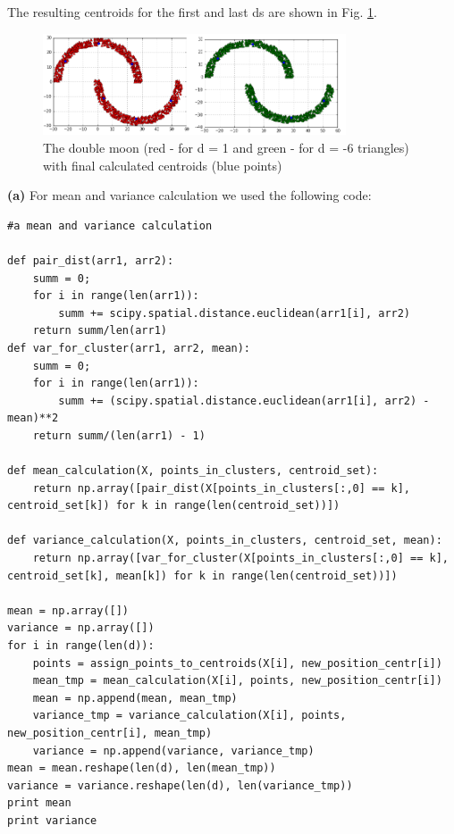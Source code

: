 \documentclass[a4paper, 12pt]{article}
\begin{document}
The resulting centroids for the first and last ds are shown in Fig. \ref{fig:centrFin}. \\

\begin{figure}[h]
  \centering
  \caption{The double moon (red - for d = 1 and green - for d = -6 triangles) with final calculated centroids (blue points) \label{fig:centrFin}}
  \includegraphics[width=0.8\textwidth]{centrFin}
\end{figure}

\textbf{(a)} For mean and variance calculation we used the following code:

\begin{lstlisting}
#a mean and variance calculation

def pair_dist(arr1, arr2):
    summ = 0;
    for i in range(len(arr1)):
        summ += scipy.spatial.distance.euclidean(arr1[i], arr2)
    return summ/len(arr1)
def var_for_cluster(arr1, arr2, mean):
    summ = 0;
    for i in range(len(arr1)):
        summ += (scipy.spatial.distance.euclidean(arr1[i], arr2) - mean)**2
    return summ/(len(arr1) - 1)

def mean_calculation(X, points_in_clusters, centroid_set):
    return np.array([pair_dist(X[points_in_clusters[:,0] == k], centroid_set[k]) for k in range(len(centroid_set))])

def variance_calculation(X, points_in_clusters, centroid_set, mean):
    return np.array([var_for_cluster(X[points_in_clusters[:,0] == k], centroid_set[k], mean[k]) for k in range(len(centroid_set))])

mean = np.array([])
variance = np.array([])
for i in range(len(d)):
    points = assign_points_to_centroids(X[i], new_position_centr[i])
    mean_tmp = mean_calculation(X[i], points, new_position_centr[i])
    mean = np.append(mean, mean_tmp)
    variance_tmp = variance_calculation(X[i], points, new_position_centr[i], mean_tmp)
    variance = np.append(variance, variance_tmp)
mean = mean.reshape(len(d), len(mean_tmp))
variance = variance.reshape(len(d), len(variance_tmp))
print mean
print variance
\end{lstlisting}
\end{document}

